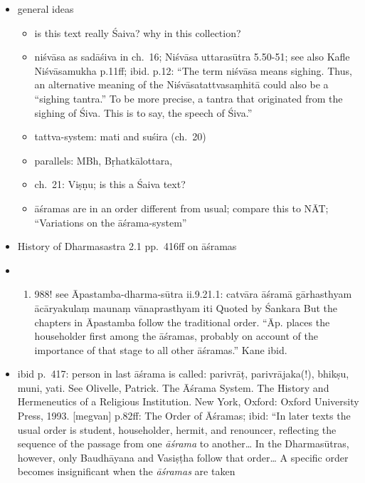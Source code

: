 \documentclass[]{article}
\providecommand{\tightlist}{%
  \setlength{\itemsep}{0pt}\setlength{\parskip}{0pt}}
\begin{document}
\begin{itemize}
\item
  general ideas

  \begin{itemize}
  \tightlist
  \item
    is this text really Śaiva? why in this collection?
  \item
    niśvāsa as sadāśiva in ch.~16; Niśvāsa uttarasūtra 5.50-51; see also
    Kafle Niśvāsamukha p.11ff; ibid. p.12: ``The term niśvāsa means
    sighing. Thus, an alternative meaning of the Niśvāsatattvasaṃhitā
    could also be a ``sighing tantra.'' To be more precise, a tantra
    that originated from the sighing of Śiva. This is to say, the speech
    of Śiva.''
  \item
    tattva-system: mati and suśira (ch.~20)
  \item
    parallels: MBh, Bṛhatkālottara,
  \item
    ch.~21: Viṣṇu; is this a Śaiva text?
  \item
    āśramas are in an order different from usual; compare this to NĀT;
    ``Variations on the āśrama-system''
  \end{itemize}
\item
  History of Dharmasastra 2.1 pp.~416ff on āśramas
\item
  \begin{enumerate}
  \def\labelenumi{\alph{enumi}.}
  \setcounter{enumi}{13}
  \tightlist
  \item
    988! see Āpastamba-dharma-sūtra ii.9.21.1: catvāra āśramā
    gārhasthyam ācāryakulaṃ maunaṃ vānaprasthyam iti\textbar{} Quoted by
    Śankara But the chapters in Āpastamba follow the traditional order.
    ``Āp. places the householder first among the āśramas, probably on
    account of the importance of that stage to all other āśramas.'' Kane
    ibid.
  \end{enumerate}
\item
  ibid p.~417: person in last āśrama is called: parivrāṭ,
  parivrājaka(!), bhikṣu, muni, yati. See Olivelle, Patrick. The Āśrama
  System. The History and Hermeneutics of a Religious Institution. New
  York, Oxford: Oxford University Press, 1993. {[}megvan{]} p.82ff: The
  Order of Āśramas; ibid: ``In later texts the usual order is student,
  householder, hermit, and renouncer, reflecting the sequence of the
  passage from one \emph{āśrama} to another\ldots{} In the Dharmasūtras,
  however, only Baudhāyana and Vasiṣṭha follow that order\ldots{} A
  specific order becomes insignificant when the \emph{āśramas} are taken

\end{itemize}
\end{document}
